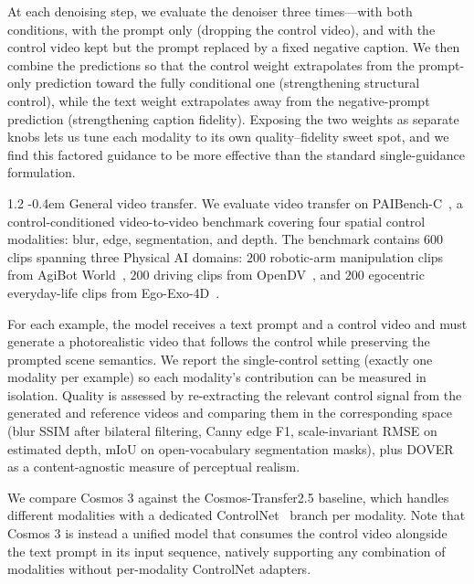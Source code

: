 \documentclass{llmxive}
\makeatletter
\providecommand{\paragraph}{  \@startsection{paragraph}{4}{\z@}    {1\baselineskip \@plus .2\baselineskip}    {-0.4em}    {\normalfont\normalsize\bfseries}}
\makeatother
\begin{document}
At each denoising step, we evaluate the denoiser three times---with both conditions, with the prompt only (dropping the control video), and with the control video kept but the prompt replaced by a fixed negative caption. We then combine the predictions so that the control weight extrapolates from the prompt-only prediction toward the fully conditional one (strengthening structural control), while the text weight extrapolates away from the negative-prompt prediction (strengthening caption fidelity). Exposing the two weights as separate knobs lets us tune each modality to its own quality--fidelity sweet spot, and we find this factored guidance to be more effective than the standard single-guidance formulation.

\paragraph{General video transfer.}
We evaluate video transfer on PAIBench-C~\citep{cosmos_transfer1}, a control-conditioned video-to-video benchmark covering four spatial control modalities: blur, edge, segmentation, and depth. The benchmark contains $600$ clips spanning three Physical AI domains: $200$ robotic-arm manipulation clips from AgiBot World~\citep{bu2025agibot}, $200$ driving clips from OpenDV~\citep{yang2024genad}, and $200$ egocentric everyday-life clips from Ego-Exo-4D~\citep{grauman2024egoexo4d}.

For each example, the model receives a text prompt and a control video and must generate a photorealistic video that follows the control while preserving the prompted scene semantics. We report the single-control setting (exactly one modality per example) so each modality's contribution can be measured in isolation. Quality is assessed by re-extracting the relevant control signal from the generated and reference videos and comparing them in the corresponding space (blur SSIM after bilateral filtering, Canny edge F1, scale-invariant RMSE on estimated depth, mIoU on open-vocabulary segmentation masks), plus DOVER~\citep{dover} as a content-agnostic measure of perceptual realism.

We compare Cosmos 3 against the Cosmos-Transfer2.5 baseline, which handles different modalities with a dedicated ControlNet~\citep{Zhang_2023_ICCV} branch per modality. Note that Cosmos 3 is instead a unified model that consumes the control video alongside the text prompt in its input sequence, natively supporting any combination of modalities without per-modality ControlNet adapters.
\end{document}
